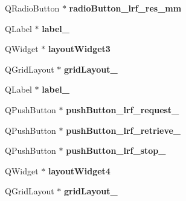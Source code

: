 \begin{DoxyCompactItemize}
\item 
\hypertarget{class_ui___main_window_ac5371e73462a4e7982e20a31984209c0}{}Q\+Radio\+Button $\ast$ {\bfseries radio\+Button\+\_\+lrf\+\_\+res\+\_\+mm}\label{class_ui___main_window_ac5371e73462a4e7982e20a31984209c0}

\item 
\hypertarget{class_ui___main_window_ad6bab8fb8903b8f41afea1218ee52695}{}Q\+Label $\ast$ {\bfseries label\+\_}\label{class_ui___main_window_ad6bab8fb8903b8f41afea1218ee52695}

\item 
\hypertarget{class_ui___main_window_a17cbf43ae5323e4121225f483c2f2824}{}Q\+Widget $\ast$ {\bfseries layout\+Widget3}\label{class_ui___main_window_a17cbf43ae5323e4121225f483c2f2824}

\item 
\hypertarget{class_ui___main_window_adbbd44debcfc24db144006951bf7b3e1}{}Q\+Grid\+Layout $\ast$ {\bfseries grid\+Layout\+\_}\label{class_ui___main_window_adbbd44debcfc24db144006951bf7b3e1}

\item 
\hypertarget{class_ui___main_window_a7a9350c6de61e7051850744487d910bd}{}Q\+Label $\ast$ {\bfseries label\+\_}\label{class_ui___main_window_a7a9350c6de61e7051850744487d910bd}

\item 
\hypertarget{class_ui___main_window_ad3f0ee52c147bb9e62086b990e429fee}{}Q\+Push\+Button $\ast$ {\bfseries push\+Button\+\_\+lrf\+\_\+request\+\_}\label{class_ui___main_window_ad3f0ee52c147bb9e62086b990e429fee}

\item 
\hypertarget{class_ui___main_window_a7fcb1f46747d4b0e5bbd5cb72e932312}{}Q\+Push\+Button $\ast$ {\bfseries push\+Button\+\_\+lrf\+\_\+retrieve\+\_}\label{class_ui___main_window_a7fcb1f46747d4b0e5bbd5cb72e932312}

\item 
\hypertarget{class_ui___main_window_acfb77433cf941396a64f41d4fada7bb0}{}Q\+Push\+Button $\ast$ {\bfseries push\+Button\+\_\+lrf\+\_\+stop\+\_}\label{class_ui___main_window_acfb77433cf941396a64f41d4fada7bb0}

\item 
\hypertarget{class_ui___main_window_a6697c4b75a94a17e8cc5f78a7b6b785d}{}Q\+Widget $\ast$ {\bfseries layout\+Widget4}\label{class_ui___main_window_a6697c4b75a94a17e8cc5f78a7b6b785d}

\item 
\hypertarget{class_ui___main_window_a16419b7fa6d38eb8c34d4a937c5d8ecd}{}Q\+Grid\+Layout $\ast$ {\bfseries grid\+Layout\+\_}\label{class_ui___main_window_a16419b7fa6d38eb8c34d4a937c5d8ecd}


\end{DoxyCompactItemize}
